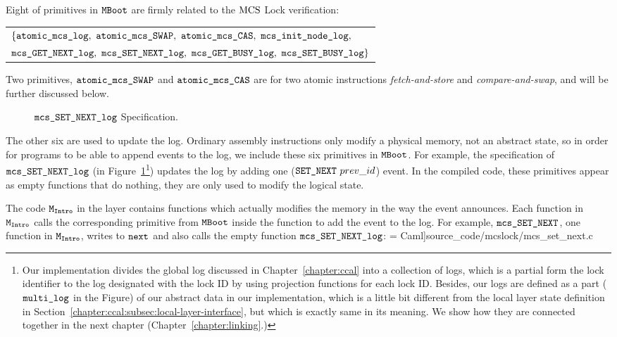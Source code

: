 Eight of  primitives in ${\mathrm{\texttt{MBoot}}}$  are firmly related to the $\mathrm{MCS}$ Lock verification:

\begin{center}
\begin{tabular}{P{0.95\textwidth}}
$\{\atomicmcslog,\  \atomicmcsswap,\ \atomicmcscas,\ \mcsinitnodelog,$\\
$\mcsgetnextlog,\ \mcssetnextlog,\ \mcsgetbusylog,\ \mcssetbusylog\} $\\
\end{tabular}
\end{center}

Two primitives, ${\mathrm{\texttt{atomic\_mcs\_SWAP}}}$ and ${\mathrm{\texttt{atomic\_mcs\_CAS}}}$ are for  two atomic instructions {\em fetch-and-store} and {\em compare-and-swap}, and will be further discussed below.

\begin{figure}
\begin{center}
 
\end{center}
\caption{${\mathrm{\texttt{mcs\_SET\_NEXT\_log}}}$ Specification.}
\label{fig:chapter:mcslock:specification-of-mcssetnextlog}
\end{figure}

The other six are used to update the log.  
Ordinary assembly instructions only modify a physical memory, not
an abstract state, so in order for programs to be able to append events to
the log, we include these six primitives in ${\mathrm{\texttt{MBoot}}}$. 
For example, the specification of ${\mathrm{\texttt{mcs\_SET\_NEXT\_log}}}$ (in Figure~\ref{fig:chapter:mcslock:specification-of-mcssetnextlog}\footnote{Our implementation divides the global log discussed in Chapter~\ref{chapter:ccal} into a collection of logs, which is a partial form the lock identifier to the log designated with the lock ID by using projection functions for each lock ID. Besides, our logs are defined as a part (${\mathrm{\texttt{multi\_log}}}$ in the Figure) of our abstract data in our implementation, which is a little bit different from the local layer state definition in Section~\ref{chapter:ccal:subsec:local-layer-interface}, but which is exactly same in its meaning. We show how they are connected together in the next chapter  (Chapter~\ref{chapter:linking}.)})
updates the log by adding one (${\mathrm{\texttt{SET\_NEXT}}}~{prev\_id}$) event.
In the compiled code, these primitives appear as empty functions that do nothing, they are only used to modify the logical state.

The code ${\mathrm{\texttt{M}}}_{{\mathrm{\texttt{Intro}}}}$ in the layer contains  
functions which actually modifies the memory in the way the event announces.
Each function in ${\mathrm{\texttt{M}}}_{{\mathrm{\texttt{Intro}}}}$ calls the corresponding primitive from
${\mathrm{\texttt{MBoot}}}$ inside the function to add the event to the log.
For example, ${\mathrm{\texttt{mcs\_SET\_NEXT}}}$, one function in ${\mathrm{\texttt{M}}}_{{\mathrm{\texttt{Intro}}}}$, writes
to ${\mathrm{\texttt{next}}}$ and also calls
the empty function ${\mathrm{\texttt{mcs\_SET\_NEXT\_log}}}$:
 = Caml]{source_code/mcslock/mcs_set_next.c}


